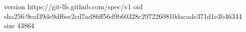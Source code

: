 version https://git-lfs.github.com/spec/v1
oid sha256:9eaf39de9df6ee2cd7ad86ff56d9b60328c2972260810dacadc371d1e3b46344
size 43864
